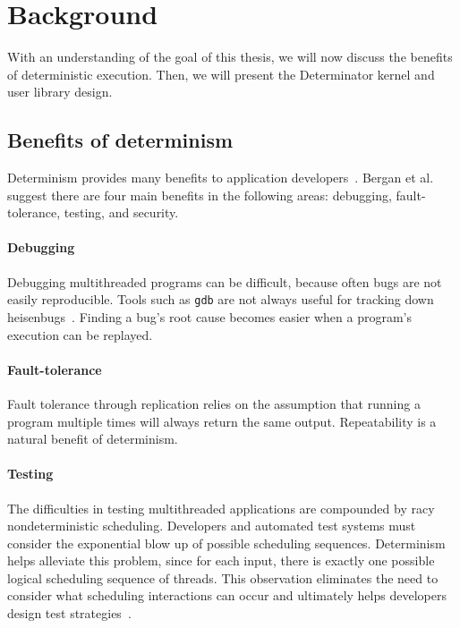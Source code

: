 
\section{Background}

With an understanding of the goal of this thesis, we will now discuss the
benefits of deterministic execution. Then, we will present the Determinator
kernel and user library design.

\subsection{Benefits of determinism}
\label{sec:det-motiv}

Determinism provides many benefits to application
developers~\cite{Bergan11,olszewski2009kendo,bocchino2009parallel}. Bergan et
al. suggest there are four main benefits in
the following areas: debugging, fault-tolerance, testing, and security.

\paragraph{Debugging} Debugging multithreaded programs can be difficult, because
often bugs are not easily reproducible. Tools such as {\tt gdb} are not
always useful for tracking down heisenbugs~\cite{Musuvathi08}. Finding a bug's
root cause becomes easier when a program's execution can be replayed.

\paragraph{Fault-tolerance} Fault tolerance through replication relies
on the assumption that running a program multiple times will always return the
same output. Repeatability is a natural benefit of determinism.

\paragraph{Testing} The difficulties in testing multithreaded applications are
compounded by racy nondeterministic scheduling. Developers and automated test
systems must consider the exponential blow up of possible scheduling sequences.
Determinism helps alleviate this problem, since for each input, there is exactly
one possible logical scheduling sequence of threads. This observation eliminates
the need to consider what scheduling interactions can occur and ultimately
helps developers design test strategies~\cite{Bergan11}.

